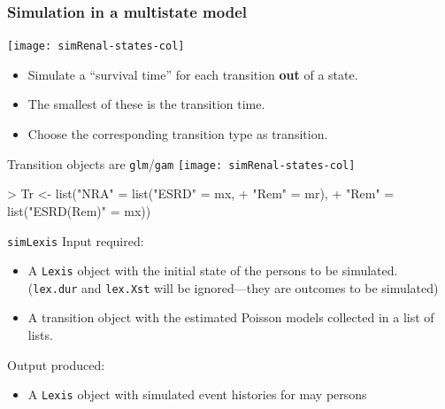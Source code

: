 \begin{frame}
   \frametitle{Simulation in a multistate model}
\vspace*{-1ex}
\texttt{[image: simRenal-states-col]}
\pause
\vspace*{-1ex}
   \begin{itemize}[<+->]
   \item Simulate a ``survival time'' for each transition
     \textbf{out} of a state.
   \item The smallest of these is the transition time.
   \item Choose the corresponding transition type as transition.
   \end{itemize}
\end{frame}

\begin{frame}[fragile]{Transition objects are \texttt{glm}/\texttt{gam}}
\vspace*{-1ex}
\texttt{[image: simRenal-states-col]}
\vspace*{-1ex}
\renewcommand{\baselinestretch}{0.8}
\small
\begin{Schunk}
\begin{Sinput}
> Tr <- list("NRA" = list("ESRD"      = mx,
+                         "Rem"       = mr),
+            "Rem" = list("ESRD(Rem)" = mx))
\end{Sinput}
\end{Schunk}
\normalsize
\renewcommand{\baselinestretch}{1.0}

\end{frame}

\begin{frame}{\texttt{simLexis}}
Input required:
   \begin{itemize}
   \item A \texttt{Lexis} object with the initial state of the
     persons to be simulated.\\
     (\texttt{lex.dur} and \texttt{lex.Xst} will be ignored---they are
     outcomes to be simulated)
 \item A transition object with the estimated Poisson models collected
   in a list of lists.
   \end{itemize}
\pause
Output produced:
\pause
\begin{itemize}
\item A \texttt{Lexis} object with simulated event histories for may
  persons
\end{itemize}

\end{frame}

